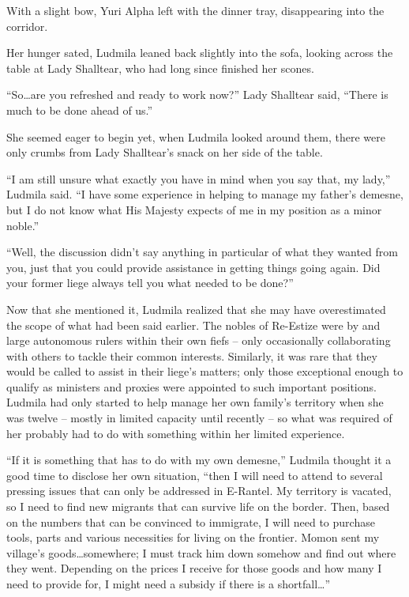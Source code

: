 With a slight bow, Yuri Alpha left with the dinner tray, disappearing into the corridor.

 

Her hunger sated, Ludmila leaned back slightly into the sofa, looking across the table at Lady Shalltear, who had long since finished her scones.

 

“So…are you refreshed and ready to work now?” Lady Shalltear said, “There is much to be done ahead of us.”

 

She seemed eager to begin yet, when Ludmila looked around them, there were only crumbs from Lady Shalltear’s snack on her side of the table.

 

“I am still unsure what exactly you have in mind when you say that, my lady,” Ludmila said. “I have some experience in helping to manage my father’s demesne, but I do not know what His Majesty expects of me in my position as a minor noble.”

 

“Well, the discussion didn’t say anything in particular of what they wanted from you, just that you could provide assistance in getting things going again. Did your former liege always tell you what needed to be done?”

 

Now that she mentioned it, Ludmila realized that she may have overestimated the scope of what had been said earlier. The nobles of Re-Estize were by and large autonomous rulers within their own fiefs – only occasionally collaborating with others to tackle their common interests. Similarly, it was rare that they would be called to assist in their liege’s matters; only those exceptional enough to qualify as ministers and proxies were appointed to such important positions. Ludmila had only started to help manage her own family’s territory when she was twelve – mostly in limited capacity until recently – so what was required of her probably had to do with something within her limited experience.

 

“If it is something that has to do with my own demesne,” Ludmila thought it a good time to disclose her own situation, “then I will need to attend to several pressing issues that can only be addressed in E-Rantel. My territory is vacated, so I need to find new migrants that can survive life on the border. Then, based on the numbers that can be convinced to immigrate, I will need to purchase tools, parts and various necessities for living on the frontier. Momon sent my village’s goods…somewhere; I must track him down somehow and find out where they went. Depending on the prices I receive for those goods and how many I need to provide for, I might need a subsidy if there is a shortfall…”

